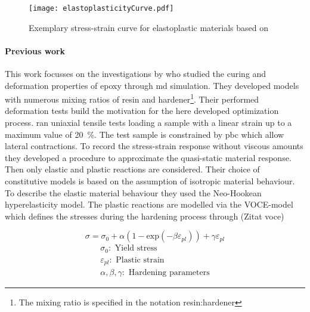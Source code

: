 \begin{figure}[H]
    \centering
    \texttt{[image: elastoplasticityCurve.pdf]}
    \caption{Exemplary stress-strain curve for elastoplastic materials based on \cite{mergheim_lecture_nodate}}
    \label{fig:elastoplasticityCurve}
\end{figure}




\paragraph{Previous work}
This work focusses on the investigations by \citet{ries_deciphering_nodate} who studied the curing and deformation properties of epoxy through \acrshort{md} simulation. They developed models with numerous mixing ratios of resin and hardener\footnote{The mixing ratio is specified in the notation resin:hardener}. Their performed deformation tests build the motivation for the here developed optimization process. \citet{ries_deciphering_nodate} ran uniaxial tensile tests loading a sample with a linear strain up to a maximum value of 20 \%. The test sample is constrained by \acrshort{pbc} which allow lateral contractions. To record the stress-strain response without viscous amounts they developed a procedure to approximate the quasi-static material response. Then only elastic and plastic reactions are considered. Their choice of constitutive models is based on the assumption of isotropic material behaviour. To describe the elastic material behaviour they used the Neo-Hookean hyperelasticity model. The plastic reactions are modelled via the VOCE-model which defines the stresses during the hardening process through (Zitat voce)

\begin{equation} \label{eq: voce}
    \sigma = \sigma_0 + \alpha(1 - \text{exp}(-\beta \varepsilon_{pl})) + \gamma \varepsilon_{pl}
\end{equation}
\begin{gather*}
    \sigma_0: \text{ Yield stress} \\
    \varepsilon_{pl}: \text{ Plastic strain} \\
    \alpha, \beta,  \gamma: \text{ Hardening parameters}
\end{gather*}


